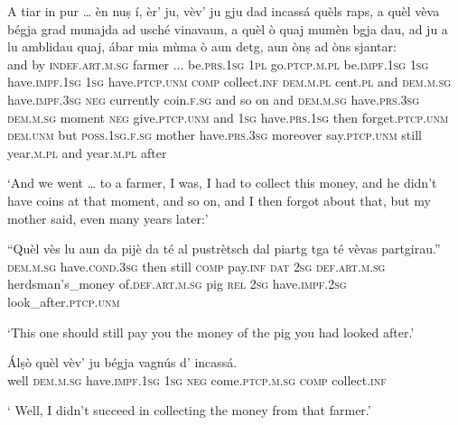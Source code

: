 \begin{linenumbers}
	\gll    A tiar in pur … èn\footnotemark{} nuṣ í, èr’ ju, vèv’ ju gju dad incassá quèls raps, a quèl vèva bégja grad  munajda ad usché vinavaun, a quèl ò quaj mumèn bgja dau, ad ju a lu amblidau quaj, ábar mia mùma ò aun detg, aun ònṣ ad òns sjantar: \\ 
	and by \textsc{indef.art.m.sg} farmer ... be.\textsc{prs.1sg} \textsc{1pl} go.\textsc{ptcp.m.pl}  be.\textsc{impf.1sg} \textsc{1sg}  have.\textsc{impf.1sg} \textsc{1sg} have.\textsc{ptcp.unm} \textsc{comp} collect.\textsc{inf}  \textsc{dem.m.pl} cent.\textsc{pl} and \textsc{dem.m.sg} have.\textsc{impf.3sg}  \textsc{neg} currently coin.\textsc{f.sg} and so on and  \textsc{dem.m.sg} have.\textsc{prs.3sg} \textsc{dem.m.sg} moment \textsc{neg}  give.\textsc{ptcp.unm} and \textsc{1sg} have.\textsc{prs.1sg} then  forget.\textsc{ptcp.unm} \textsc{dem.unm} but \textsc{poss.1sg.f.sg} mother have.\textsc{prs.3sg} moreover  say.\textsc{ptcp.unm} still year.\textsc{m.pl} and year.\textsc{m.pl} after\\
\end{linenumbers}
	\medskip
	\glt `And we went … to a farmer, I was, I had to collect this money, and he didn’t have coins at that moment, and so on, and I then forgot about that, but my mother said, even many years later:'
	\medskip

\begin{linenumbers}
	\gll    “Quèl vès lu aun da pijè da té al pustrètsch dal piartg tga té vèvas partgirau.” \\
	\textsc{dem.m.sg} have.\textsc{cond.3sg} then still \textsc{comp} pay.\textsc{inf} \textsc{dat} \textsc{2sg} \textsc{def.art.m.sg} herdsman's\_money of.\textsc{def.art.m.sg} pig \textsc{rel} \textsc{2sg} have.\textsc{impf.2sg} look\_after.\textsc{ptcp.unm}\\
\end{linenumbers}
\medskip
	\glt `This one should still pay you the money of the pig you had looked after.'
	\medskip

\begin{linenumbers}
	\gll  Álṣò quèl vèv' ju bégja vagnús d’ incassá. \\
	well \textsc{dem.m.sg} have.\textsc{impf.1sg} \textsc{1sg} \textsc{neg} come.\textsc{ptcp.m.sg}  \textsc{comp} collect.\textsc{inf}\\
\end{linenumbers}
	\medskip
	\glt ` Well, I didn’t succeed in collecting the money from that farmer.'
	\medskip


